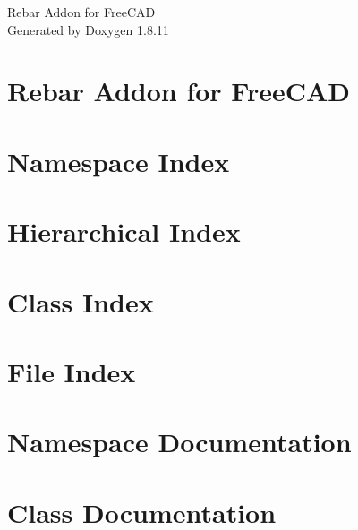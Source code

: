 \documentclass[twoside]{book}
\newcommand{\+}{\discretionary{\mbox{\scriptsize$\hookleftarrow$}}{}{}}
\newcommand{\clearemptydoublepage}{%
  \newpage{\pagestyle{empty}\cleardoublepage}%
}
\begin{document}
\hypersetup{pageanchor=false,
             bookmarksnumbered=true,
             pdfencoding=unicode
            }
\begin{titlepage}
\vspace*{7cm}
\begin{center}%
{\Large Rebar Addon for Free\+C\+AD }\\
\vspace*{1cm}
{\large Generated by Doxygen 1.8.11}\\
\end{center}
\end{titlepage}
\clearemptydoublepage
\tableofcontents
\clearemptydoublepage
{}
\hypersetup{pageanchor=true}

\chapter{Rebar Addon for Free\+C\+AD}
\label{index}\hypertarget{index}{}
\chapter{Namespace Index}

\chapter{Hierarchical Index}

\chapter{Class Index}

\chapter{File Index}

\chapter{Namespace Documentation}










\chapter{Class Documentation}














\end{document}
